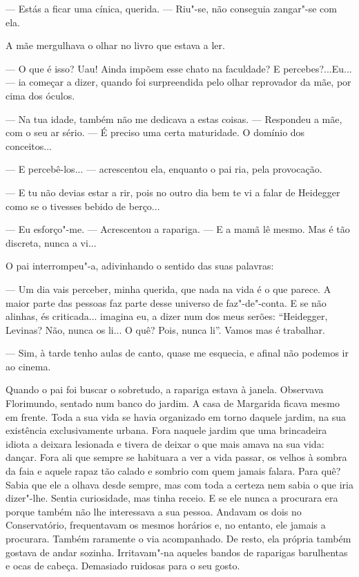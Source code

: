 --- Estás a ficar uma cínica, querida. ---  Riu"-se, não conseguia zangar"-se
com ela.

A mãe mergulhava o olhar no livro que estava a ler.

--- O que é isso? Uau! Ainda impõem esse chato na faculdade? E
percebes?...Eu... --- ia começar a dizer, quando foi surpreendida pelo
olhar reprovador da mãe, por cima dos óculos.

--- Na tua idade, também não me dedicava a estas coisas. --- Respondeu a
mãe, com o seu ar sério. --- É preciso uma certa maturidade. O domínio dos
conceitos...

--- E percebê-los... --- acrescentou ela, enquanto o pai ria, pela
provocação.

--- E tu não devias estar a rir, pois no outro dia bem te vi a falar de
Heidegger como se o tivesses bebido de berço...

--- Eu esforço"-me. --- Acrescentou a rapariga. --- E a mamã lê mesmo. Mas é
tão discreta, nunca a vi...

O pai interrompeu"-a, adivinhando o sentido das suas palavras:

--- Um dia vais perceber, minha querida, que nada na vida é o que parece.
A maior parte das pessoas faz parte desse universo de faz"-de"-conta. E se
não alinhas, és criticada... imagina eu, a dizer num dos meus serões:
``Heidegger, Levinas? Não, nunca os li... O quê? Pois, nunca li''. Vamos
mas é trabalhar.

--- Sim, à tarde tenho aulas de canto, quase me esquecia, e afinal não
podemos ir ao cinema.

Quando o pai foi buscar o sobretudo, a rapariga estava à janela.
Observava Florimundo, sentado num banco do jardim. A casa de Margarida
ficava mesmo em frente. Toda a sua vida se havia organizado em torno
daquele jardim, na sua existência exclusivamente urbana. Fora naquele
jardim que uma brincadeira idiota a deixara lesionada e tivera de deixar
o que mais amava na sua vida: dançar. Fora ali que sempre se habituara a
ver a vida passar, os velhos à sombra da faia e aquele rapaz tão calado
e sombrio com quem jamais falara. Para quê? Sabia que ele a olhava desde
sempre, mas com toda a certeza nem sabia o que iria dizer"-lhe. Sentia
curiosidade, mas tinha receio. E se ele nunca a procurara era porque
também não lhe interessava a sua pessoa. Andavam os dois no
Conservatório, frequentavam os mesmos horários e, no entanto, ele jamais
a procurara. Também raramente o via acompanhado. De resto, ela própria
também gostava de andar sozinha. Irritavam"-na aqueles bandos de
raparigas barulhentas e ocas de cabeça. Demasiado ruidosas para o seu
gosto.

